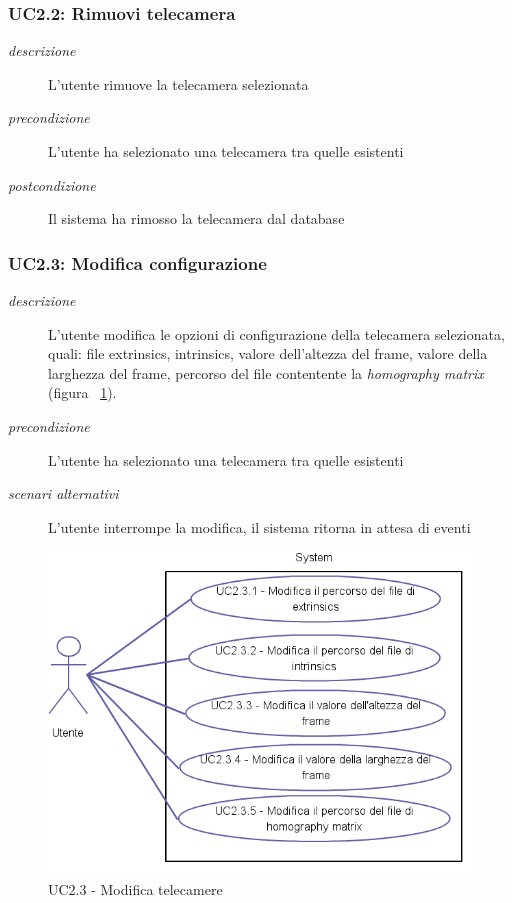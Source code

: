 \subsubsection{UC2.2: Rimuovi telecamera}
\begin{description}
 \item[\em{descrizione}] L'utente rimuove la telecamera selezionata
  \item[\em{precondizione}] L'utente ha selezionato una telecamera tra quelle esistenti
 \item[\em{postcondizione}] Il sistema ha rimosso la telecamera dal database
 \end{description}
 
\subsubsection{UC2.3: Modifica configurazione}
\begin{description}
 \item[\em{descrizione}] L'utente modifica le opzioni di configurazione della telecamera selezionata, quali: file extrinsics, intrinsics, valore dell'altezza del frame, valore della larghezza del frame, percorso del file contentente la \textit{homography matrix} (figura ~\ref{fig:uc23}).
  \item[\em{precondizione}] L'utente ha selezionato una telecamera tra quelle esistenti
  \item[\em{scenari alternativi}] L'utente interrompe la modifica, il sistema ritorna in attesa di eventi
 \end{description}
 \begin{figure}[htpb]
\centering
\includegraphics[scale=0.4]{./images/uc23.png}
\caption{UC2.3 - Modifica telecamere}
\label{fig:uc23}
\end{figure} 

